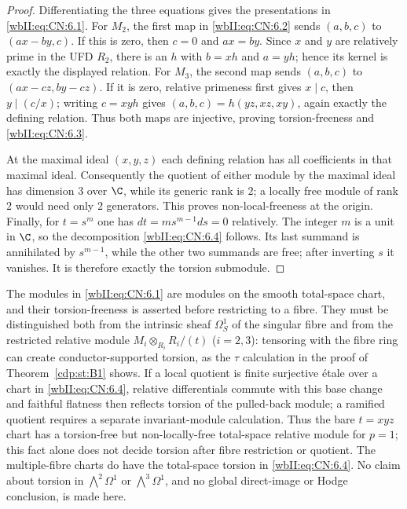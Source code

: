 \begin{proof}
Differentiating the three equations gives the presentations in \eqref{wbII:eq:CN:6.1}.  For
$M_2$, the first map in \eqref{wbII:eq:CN:6.2} sends $(a,b,c)$ to $(ax-by,c)$.  If this is
zero, then $c=0$ and $ax=by$.  Since $x$ and $y$ are relatively prime in the
UFD $R_2$, there is an $h$ with $b=xh$ and $a=yh$; hence its kernel is exactly
the displayed relation.  For $M_3$, the second map sends $(a,b,c)$ to
$(ax-cz,by-cz)$.  If it is zero, relative primeness first gives $x\mid c$,
then $y\mid(c/x)$; writing $c=xyh$ gives
$(a,b,c)=h(yz,xz,xy)$, again exactly the defining relation.  Thus both maps
are injective, proving torsion-freeness and \eqref{wbII:eq:CN:6.3}.

At the maximal ideal $(x,y,z)$ each defining relation has all coefficients in
that maximal ideal.  Consequently the quotient of either module by the
maximal ideal has dimension $3$ over $\C$, while its generic rank is $2$;
a locally free module of rank $2$ would need only $2$ generators.  This proves
non-local-freeness at the origin.  Finally, for $t=s^m$ one has
$dt=m s^{m-1}ds=0$ relatively.  The integer $m$ is a unit in $\C$, so the
decomposition \eqref{wbII:eq:CN:6.4} follows.  Its last summand is annihilated by
$s^{m-1}$, while the other two summands are free; after inverting $s$ it
vanishes.  It is therefore exactly the torsion submodule.
\end{proof}

\begin{remark}
\label{wbII:rem:relative-local-scope}
The modules in \eqref{wbII:eq:CN:6.1} are modules on the smooth total-space chart, and their
torsion-freeness is asserted before restricting to a fibre.  They must be
distinguished both from the intrinsic sheaf $\Omega^1_S$ of the singular
fibre and from the restricted relative module
$M_i\otimes_{R_i}R_i/(t)$ ($i=2,3$): tensoring with the fibre ring can create
conductor-supported torsion, as the $\tau$ calculation in the proof of
Theorem~\ref{cdp:st:B1} shows.  If a local quotient is finite
surjective \'{e}tale over a chart in \eqref{wbII:eq:CN:6.4}, relative differentials commute with
this base change and faithful flatness then reflects torsion of the pulled-back
module; a ramified quotient
requires a separate invariant-module calculation.  Thus the bare $t=xyz$
chart has a torsion-free but non-locally-free total-space relative module for
$p=1$; this fact alone does not decide torsion after fibre restriction or
quotient.  The multiple-fibre charts do have the total-space torsion in
\eqref{wbII:eq:CN:6.4}.  No claim about torsion in $\bigwedge^2\Omega^1$ or
$\bigwedge^3\Omega^1$, and no global direct-image or Hodge conclusion, is
made here.
\end{remark}

